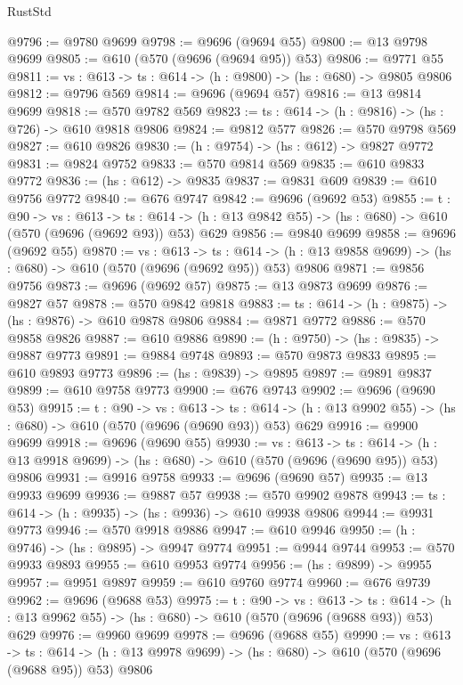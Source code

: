 \begin{lexlean}{RustStd}
\begin{coremodule}
@9796 := @9780 @9699
@9798 := @9696 (@9694 @55)
@9800 := @13 @9798 @9699
@9805 := @610 (@570 (@9696 (@9694 @95)) @53)
@9806 := @9771 @55
@9811 := {vs : @613} -> {ts : @614} -> (h : @9800) -> (hs : @680) -> @9805 @9806
@9812 := @9796 @569
@9814 := @9696 (@9694 @57)
@9816 := @13 @9814 @9699
@9818 := @570 @9782 @569
@9823 := {ts : @614} -> (h : @9816) -> (hs : @726) -> @610 @9818 @9806
@9824 := @9812 @577
@9826 := @570 @9798 @569
@9827 := @610 @9826
@9830 := (h : @9754) -> (hs : @612) -> @9827 @9772
@9831 := @9824 @9752
@9833 := @570 @9814 @569
@9835 := @610 @9833 @9772
@9836 := (hs : @612) -> @9835
@9837 := @9831 @609
@9839 := @610 @9756 @9772
@9840 := @676 @9747
@9842 := @9696 (@9692 @53)
@9855 := {t : @90} ->
  {vs : @613} ->
  {ts : @614} -> (h : @13 @9842 @55) -> (hs : @680) -> @610 (@570 (@9696 (@9692 @93)) @53) @629
@9856 := @9840 @9699
@9858 := @9696 (@9692 @55)
@9870 := {vs : @613} ->
  {ts : @614} -> (h : @13 @9858 @9699) -> (hs : @680) -> @610 (@570 (@9696 (@9692 @95)) @53) @9806
@9871 := @9856 @9756
@9873 := @9696 (@9692 @57)
@9875 := @13 @9873 @9699
@9876 := @9827 @57
@9878 := @570 @9842 @9818
@9883 := {ts : @614} -> (h : @9875) -> (hs : @9876) -> @610 @9878 @9806
@9884 := @9871 @9772
@9886 := @570 @9858 @9826
@9887 := @610 @9886
@9890 := (h : @9750) -> (hs : @9835) -> @9887 @9773
@9891 := @9884 @9748
@9893 := @570 @9873 @9833
@9895 := @610 @9893 @9773
@9896 := (hs : @9839) -> @9895
@9897 := @9891 @9837
@9899 := @610 @9758 @9773
@9900 := @676 @9743
@9902 := @9696 (@9690 @53)
@9915 := {t : @90} ->
  {vs : @613} ->
  {ts : @614} -> (h : @13 @9902 @55) -> (hs : @680) -> @610 (@570 (@9696 (@9690 @93)) @53) @629
@9916 := @9900 @9699
@9918 := @9696 (@9690 @55)
@9930 := {vs : @613} ->
  {ts : @614} -> (h : @13 @9918 @9699) -> (hs : @680) -> @610 (@570 (@9696 (@9690 @95)) @53) @9806
@9931 := @9916 @9758
@9933 := @9696 (@9690 @57)
@9935 := @13 @9933 @9699
@9936 := @9887 @57
@9938 := @570 @9902 @9878
@9943 := {ts : @614} -> (h : @9935) -> (hs : @9936) -> @610 @9938 @9806
@9944 := @9931 @9773
@9946 := @570 @9918 @9886
@9947 := @610 @9946
@9950 := (h : @9746) -> (hs : @9895) -> @9947 @9774
@9951 := @9944 @9744
@9953 := @570 @9933 @9893
@9955 := @610 @9953 @9774
@9956 := (hs : @9899) -> @9955
@9957 := @9951 @9897
@9959 := @610 @9760 @9774
@9960 := @676 @9739
@9962 := @9696 (@9688 @53)
@9975 := {t : @90} ->
  {vs : @613} ->
  {ts : @614} -> (h : @13 @9962 @55) -> (hs : @680) -> @610 (@570 (@9696 (@9688 @93)) @53) @629
@9976 := @9960 @9699
@9978 := @9696 (@9688 @55)
@9990 := {vs : @613} ->
  {ts : @614} -> (h : @13 @9978 @9699) -> (hs : @680) -> @610 (@570 (@9696 (@9688 @95)) @53) @9806

\end{coremodule}
\end{lexlean}
